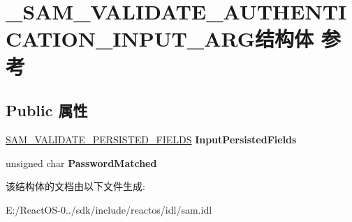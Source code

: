\hypertarget{struct___s_a_m___v_a_l_i_d_a_t_e___a_u_t_h_e_n_t_i_c_a_t_i_o_n___i_n_p_u_t___a_r_g}{}\section{\+\_\+\+S\+A\+M\+\_\+\+V\+A\+L\+I\+D\+A\+T\+E\+\_\+\+A\+U\+T\+H\+E\+N\+T\+I\+C\+A\+T\+I\+O\+N\+\_\+\+I\+N\+P\+U\+T\+\_\+\+A\+R\+G结构体 参考}
\label{struct___s_a_m___v_a_l_i_d_a_t_e___a_u_t_h_e_n_t_i_c_a_t_i_o_n___i_n_p_u_t___a_r_g}
\subsection*{Public 属性}
\begin{DoxyCompactItemize}
\item 
\mbox{\label{struct___s_a_m___v_a_l_i_d_a_t_e___a_u_t_h_e_n_t_i_c_a_t_i_o_n___i_n_p_u_t___a_r_g_ad264d4430f330155f56a1743eaac8b79}} 
\hyperlink{struct___s_a_m___v_a_l_i_d_a_t_e___p_e_r_s_i_s_t_e_d___f_i_e_l_d_s}{S\+A\+M\+\_\+\+V\+A\+L\+I\+D\+A\+T\+E\+\_\+\+P\+E\+R\+S\+I\+S\+T\+E\+D\+\_\+\+F\+I\+E\+L\+DS} {\bfseries Input\+Persisted\+Fields}
\item 
\mbox{\label{struct___s_a_m___v_a_l_i_d_a_t_e___a_u_t_h_e_n_t_i_c_a_t_i_o_n___i_n_p_u_t___a_r_g_a7756564d5dc212454a114cf4d30e860e}} 
unsigned char {\bfseries Password\+Matched}
\end{DoxyCompactItemize}


该结构体的文档由以下文件生成\+:\begin{DoxyCompactItemize}
\item 
E\+:/\+React\+O\+S-\/0../sdk/include/reactos/idl/sam.\+idl\end{DoxyCompactItemize}
